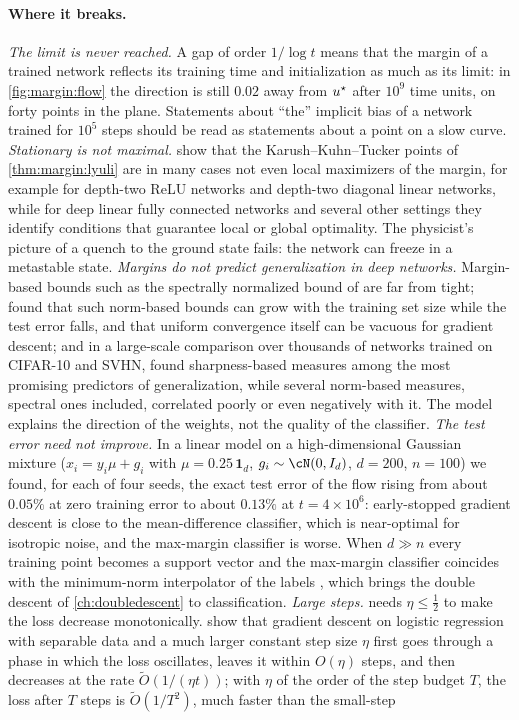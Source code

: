 \begin{refsection}
\paragraph{Where it breaks.} \emph{The limit is never reached.} A gap of order $1/\log t$ means that the margin of a trained network reflects its training time and initialization as much as its limit: in \cref{fig:margin:flow} the direction is still $0.02$ away from $u^\star$ after $10^9$ time units, on forty points in the plane. Statements about ``the'' implicit bias of a network trained for $10^5$ steps should be read as statements about a point on a slow curve. \emph{Stationary is not maximal.} \Textcite{VardiShamirSrebro2022} show that the Karush--Kuhn--Tucker points of \cref{thm:margin:lyuli} are in many cases not even local maximizers of the margin, for example for depth-two ReLU networks and depth-two diagonal linear networks, while for deep linear fully connected networks and several other settings they identify conditions that guarantee local or global optimality. The physicist's picture of a quench to the ground state fails: the network can freeze in a metastable state. \emph{Margins do not predict generalization in deep networks.} Margin-based bounds such as the spectrally normalized bound of \textcite{BartlettFosterTelgarsky2017} are far from tight; \textcite{NagarajanKolter2019} found that such norm-based bounds can grow with the training set size while the test error falls, and that uniform convergence itself can be vacuous for gradient descent; and in a large-scale comparison over thousands of networks trained on CIFAR-10 and SVHN, \textcite{JiangEtAl2020} found sharpness-based measures among the most promising predictors of generalization, while several norm-based measures, spectral ones included, correlated poorly or even negatively with it. The model explains the direction of the weights, not the quality of the classifier. \emph{The test error need not improve.} In a linear model on a high-dimensional Gaussian mixture ($x_i=y_i\mu+g_i$ with $\mu=0.25\,\mathbf 1_d$, $g_i\sim\cN(0,I_d)$, $d=200$, $n=100$) we found, for each of four seeds, the exact test error of the flow rising from about $0.05\%$ at zero training error to about $0.13\%$ at $t=4\times10^6$: early-stopped gradient descent is close to the mean-difference classifier, which is near-optimal for isotropic noise, and the max-margin classifier is worse. When $d\gg n$ every training point becomes a support vector and the max-margin classifier coincides with the minimum-norm interpolator of the labels \parencite{MuthukumarEtAl2021}, which brings the double descent of \cref{ch:doubledescent} to classification. \emph{Large steps.}  needs $\eta\le\frac12$ to make the loss decrease monotonically. \Textcite{WuEtAl2024} show that gradient descent on logistic regression with separable data and a much larger constant step size $\eta$ first goes through a phase in which the loss oscillates, leaves it within $O(\eta)$ steps, and then decreases at the rate $\tilde O(1/(\eta t))$; with $\eta$ of the order of the step budget $T$, the loss after $T$ steps is $\tilde O(1/T^2)$, much faster than the small-step 
\end{refsection}
